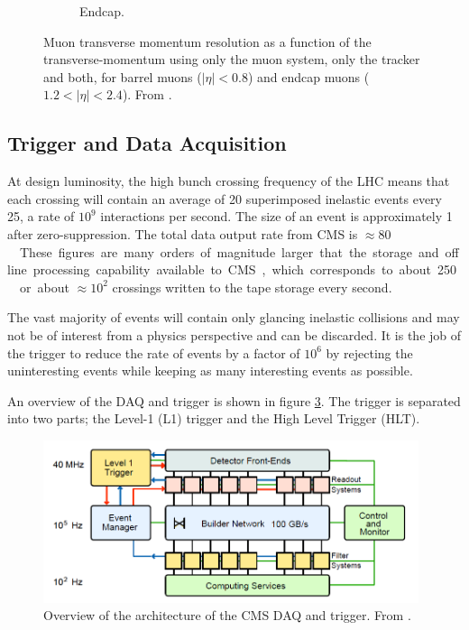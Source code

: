 \begin{figure}[htbp]
\begin{subfigure}{0.48\textwidth}
    \caption{Endcap.}
    \label{fig:muon_endcap}
  \end{subfigure}
  \caption{Muon transverse momentum resolution as a function of the
  transverse-momentum using only the muon system, only the tracker and both, for
  barrel muons ($|\eta| < 0.8$) and endcap muons ($1.2<|\eta| < 2.4$). From
  \cite{chatrchyan2008cms}.\label{fig:muon_performance}}
\end{figure}

\subsection{Trigger and Data Acquisition}
At design luminosity, the high bunch crossing frequency of the LHC means that
each crossing will contain an average of 20 superimposed inelastic
events every \unit{25}{\nano\second}, a rate of $10^{9}$ interactions per
second.
The size of an event is approximately \unit{1}{\mega\bel} after zero-suppression.
The total data output rate from CMS is \unit{$\approx 80$}{\tera\bel\per\second}.
These figures are many orders of magnitude larger that the storage and offline
processing capability available to CMS, which corresponds to about
\unit{250}{\mega\bel\per\second} or about $\approx 10^{2}$ crossings written to the tape
storage every second. 

The vast majority of events will contain only glancing inelastic collisions and
may not be of interest from a physics perspective and can be discarded.  It is
the job of the trigger to reduce the rate of events by a factor of $10^6$ by
rejecting the uninteresting events while keeping as many interesting events as
possible.

An overview of the {DAQ} and trigger is shown in figure \ref{fig:CMSDAQ}.
The trigger is separated into two parts; the Level-1 (L1) trigger and the High
Level Trigger (HLT).\cite{chatrchyan2008cms}

\begin{figure}[htbp]
  \centering
  \includegraphics[width=0.98\textwidth]{CMSDAQ}
  \caption{Overview of the architecture of the CMS DAQ and trigger. From
  \label{fig:CMSDAQ}
\cite{chatrchyan2008cms}.}
\end{figure}

